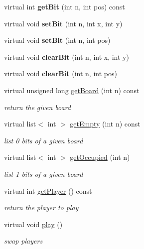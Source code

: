 \begin{DoxyCompactItemize}
\item 
\hypertarget{class_bitboard_a4f966e7856d6ca00e2f3ff9c60b84fa1}{virtual int {\bfseries get\+Bit} (int n, int pos) const }\label{class_bitboard_a4f966e7856d6ca00e2f3ff9c60b84fa1}

\item 
\hypertarget{class_bitboard_ac4e0310c5f4358c6a2324188c331baa6}{virtual void {\bfseries set\+Bit} (int n, int x, int y)}\label{class_bitboard_ac4e0310c5f4358c6a2324188c331baa6}

\item 
\hypertarget{class_bitboard_a719be7dc22698d1d6d9138ac9875328e}{virtual void {\bfseries set\+Bit} (int n, int pos)}\label{class_bitboard_a719be7dc22698d1d6d9138ac9875328e}

\item 
\hypertarget{class_bitboard_a682fc651de10664e2d0c6583609897c1}{virtual void {\bfseries clear\+Bit} (int n, int x, int y)}\label{class_bitboard_a682fc651de10664e2d0c6583609897c1}

\item 
\hypertarget{class_bitboard_a54b8503679ef35d587a6624fd910d934}{virtual void {\bfseries clear\+Bit} (int n, int pos)}\label{class_bitboard_a54b8503679ef35d587a6624fd910d934}

\item 
virtual unsigned long \hyperlink{class_bitboard_a4d75c6baadfb64ab2a0d39d4256ecd81}{get\+Board} (int n) const 
\begin{DoxyCompactList}\small\item\em return the given board \end{DoxyCompactList}\item 
virtual list$<$ int $>$ \hyperlink{class_bitboard_add99aaac08d1926daf8836165cbba82e}{get\+Empty} (int n) const 
\begin{DoxyCompactList}\small\item\em list 0 bits of a given board \end{DoxyCompactList}\item 
virtual list$<$ int $>$ \hyperlink{class_bitboard_af334925201c192ed13760fab4341bceb}{get\+Occupied} (int n)
\begin{DoxyCompactList}\small\item\em list 1 bits of a given board \end{DoxyCompactList}\item 
virtual int \hyperlink{class_bitboard_a93c3e91c8bce5425b171bfd698cad6dd}{get\+Player} () const 
\begin{DoxyCompactList}\small\item\em return the player to play \end{DoxyCompactList}\item 
\hypertarget{class_bitboard_a06f70ece7a8e4e308c7a97136d186f6c}{virtual void \hyperlink{class_bitboard_a06f70ece7a8e4e308c7a97136d186f6c}{play} ()}\label{class_bitboard_a06f70ece7a8e4e308c7a97136d186f6c}

\begin{DoxyCompactList}\small\item\em swap players \end{DoxyCompactList}\end{DoxyCompactItemize}


